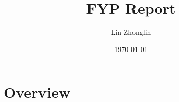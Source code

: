 \documentclass[12pt]{article}
\title{FYP Report}
\author{Lin Zhonglin}
\date{\today}
\begin{document}
\noindent

\maketitle
\tableofcontents

\section{Overview}

\end{document}
